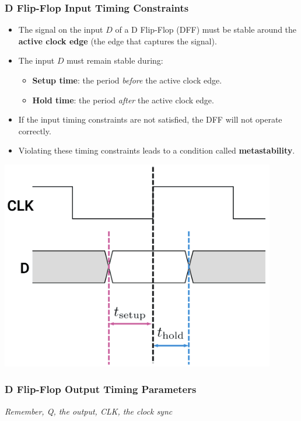 \documentclass[12pt,openany]{book}
\begin{document}
\subsubsection{D Flip-Flop \textbf{Input} Timing Constraints}
\vspace*{10px}
\begin{minipage}{0.5\textwidth}
	\begin{itemize}
	    \item[] The signal on the input \( D \) of a D Flip-Flop (DFF) must be stable around the \textbf{active clock edge} (the edge that captures the signal).
	    \item[] The input \( D \) must remain stable during:
	    \begin{itemize}
	        \item \textbf{Setup time}: the period \textit{before} the active clock edge.
	        \item \textbf{Hold time}: the period \textit{after} the active clock edge.
	    \end{itemize}
	    \item[] If the input timing constraints are not satisfied, the DFF will not operate correctly.
	    \item[] Violating these timing constraints leads to a condition called \textbf{metastability}.
	\end{itemize}
\end{minipage}
\hfill
\vline
\hfill
\begin{minipage}{0.45\textwidth}
	\includegraphics*[width=0.9\textwidth]{circuits/15.1.1.png}
\end{minipage}
\newpage
\subsubsection{D Flip-Flop Output Timing Parameters}
\vspace*{-10px}
\textit{Remember, Q, the output, CLK, the clock sync}
 \newline 
\end{document}
